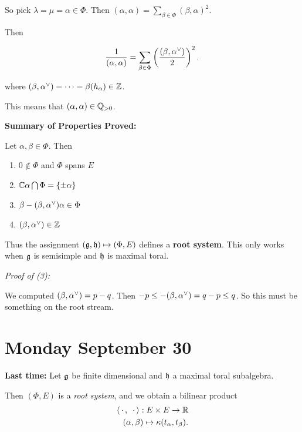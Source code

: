 So pick \(\lambda = \mu = \alpha \in \Phi\). Then
\((\alpha, \alpha) = \sum_{\beta \in \Phi} (\beta, \alpha)^2\).

Then

\begin{align*}
\frac{1}{(\alpha, \alpha)} = \sum_{\beta \in \Phi} \left(\frac{(\beta, \alpha^\vee)}{2} \right)^2
.\end{align*}

where \((\beta, \alpha^\vee) = \cdots = \beta(h_\alpha)\in {\mathbb{Z}}\).

This means that \((\alpha, \alpha) \in {\mathbb{Q}}_{> 0}\).

\textbf{Summary of Properties Proved:}

Let \(\alpha, \beta \in \Phi\). Then

\begin{enumerate}
\def\labelenumi{\arabic{enumi}.}
\tightlist
\item
  \(0 \not\in \Phi\) and \(\Phi\) spans \(E\)
\item
  \({\mathbb{C}}\alpha \bigcap \Phi = \left\{{\pm \alpha}\right\}\)
\item
  \(\beta - (\beta, \alpha^\vee)\alpha \in \Phi\)
\item
  \((\beta, \alpha^\vee) \in {\mathbb{Z}}\)
\end{enumerate}

Thus the assignment \(({\mathfrak{g}}, {\mathfrak{h}}) \mapsto (\Phi, E)\) defines a
\textbf{root system}. This only works when \({\mathfrak{g}}\) is semisimple and
\({\mathfrak{h}}\) is maximal toral.

\emph{Proof of (3):}

We computed \((\beta, \alpha^\vee) = p-q\). Then
\(-p \leq -(\beta, \alpha^\vee) = q-p \leq q\). So this must be
something on the root stream.

\hypertarget{monday-september-30}{%
\section{Monday September 30}\label{monday-september-30}}

\textbf{Last time:} Let \({\mathfrak{g}}\) be finite dimensional and \({\mathfrak{h}}\) a
maximal toral subalgebra.

Then \((\Phi, E)\) is a \emph{root system}, and we obtain a bilinear
product \begin{align*}
{\left\langle {{\,\cdot\,}},~{{\,\cdot\,}} \right\rangle}: E\times E \to {\mathbb{R}} \\
(\alpha, \beta) \mapsto \kappa(t_\alpha, t_\beta)
.\end{align*}

